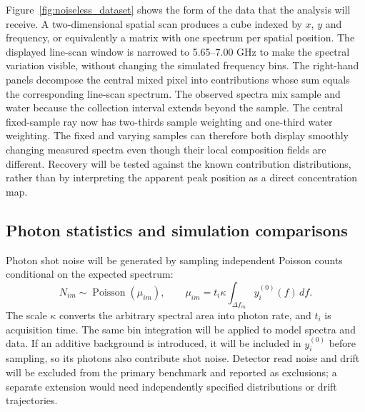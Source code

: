 \documentclass[11pt]{article}
\begin{document}
Figure~\ref{fig:noiseless_dataset} shows the form of the data that the analysis will receive. A two-dimensional spatial scan produces a cube indexed by $x$, $y$ and frequency, or equivalently a matrix with one spectrum per spatial position. The displayed line-scan window is narrowed to 5.65--7.00 GHz to make the spectral variation visible, without changing the simulated frequency bins. The right-hand panels decompose the central mixed pixel into contributions whose sum equals the corresponding line-scan spectrum. The observed spectra mix sample and water because the collection interval extends beyond the sample. The central fixed-sample ray now has two-thirds sample weighting and one-third water weighting. The fixed and varying samples can therefore both display smoothly changing measured spectra even though their local composition fields are different. Recovery will be tested against the known contribution distributions, rather than by interpreting the apparent peak position as a direct concentration map.


\subsection{Photon statistics and simulation comparisons}

Photon shot noise will be generated by sampling independent Poisson counts conditional on the expected spectrum:
\begin{equation}
 N_{im}\sim\operatorname{Poisson}(\mu_{im}),\qquad
 \mu_{im}=t_i\kappa\int_{\Delta f_m}y_i^{(0)}(f)\,df.
 \label{eq:noise_model}
\end{equation}
The scale $\kappa$ converts the arbitrary spectral area into photon rate, and $t_i$ is acquisition time. The same bin integration will be applied to model spectra and data. If an additive background is introduced, it will be included in $y_i^{(0)}$ before sampling, so its photons also contribute shot noise. Detector read noise and drift will be excluded from the primary benchmark and reported as exclusions; a separate extension would need independently specified distributions or drift trajectories.
\end{document}
